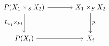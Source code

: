 \[
\begin{tikzcd}[column sep=large,row sep=large]
  P(X_1\times_S X_2)
    \arrow[r]
    \arrow[d,"L_{p_i}\times p_i"']
  &
  X_1\times_S X_2
    \arrow[d,"p_i"]
  \\
  P(X_i)
    \arrow[r]
  &
  X_i
\end{tikzcd}
\]

